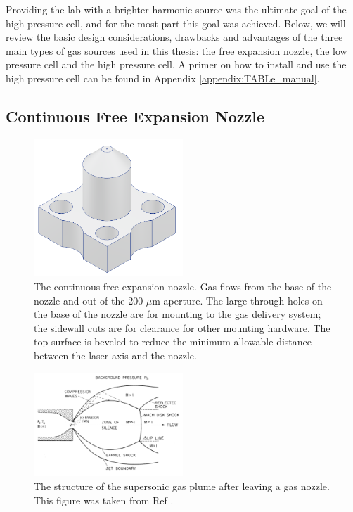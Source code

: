Providing the lab with a brighter harmonic source was the ultimate goal of the high pressure cell, and for the most part this goal was achieved. Below, we will review the basic design considerations, drawbacks and advantages of the three main types of gas sources used in this thesis: the free expansion nozzle, the low pressure cell and the high pressure cell. A primer on how to install and use the high pressure cell can be found in Appendix \ref{appendix:TABLe_manual}.

\subsection{Continuous Free Expansion Nozzle}
%
\begin{figure}
	\centering
	\includegraphics[width=0.5\textwidth]{figures/chap2/gas_nozzle.png}
	\caption{The continuous free expansion nozzle. Gas flows from the base of the nozzle and out of the 200 $\mu$m aperture. The large through holes on the base of the nozzle are for mounting to the gas delivery system; the sidewall cuts are for clearance for other mounting hardware. The top surface is beveled to reduce the minimum allowable distance between the laser axis and the nozzle.}
	\label{fig:gas_nozzle}
\end{figure}

\begin{figure}
	\centering
	\includegraphics[width=0.5\textwidth]{figures/chap2/gas_expansion.PNG}
	\caption{The structure of the supersonic gas plume after leaving a gas nozzle. This figure was taken from Ref \cite{millerFreeJetSources1988}.}
	\label{fig:gas_expansion}
\end{figure}

